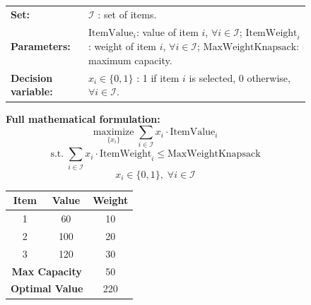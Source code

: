 \documentclass[review,12pt]{elsarticle}
\begin{document}
\begin{figure}[htbp]
{{\begin{tcolorbox}
\begin{tcolorbox}[
    width=\linewidth,
    colframe=form, 
    colback=form!6, 
    title={\textbf{Formulation}}, 
    fonttitle=\bfseries,
    halign title=center,
    boxrule=0.6pt,
    arc=2pt,
    left=1mm, right=1mm, top=0.5mm, bottom=0.5mm,
    before skip=0mm, after skip=0.5mm
]
\vspace{-6mm}
\begin{tabularx}{\linewidth}{@{}lX@{}}
\textbf{Set:} & $\mathcal{I}$ : set of items.\\
\textbf{Parameters:} &
$\text{ItemValue}_i$: value of item $i$, $\forall i \in \mathcal{I}$; 
$\text{ItemWeight}_i$: weight of item $i$, $\forall i \in \mathcal{I}$; 
$\text{MaxWeightKnapsack}$: maximum capacity.\\
\textbf{Decision variable:} & 
$x_i \in \{0,1\}$ : 1 if item $i$ is selected, 0 otherwise, $\forall i \in \mathcal{I}$.\\
\end{tabularx}

\noindent\textbf{Full mathematical formulation:}
\vspace{-3mm}
\begin{equation}
\underset{\{x_i\}}{\text{maximize}} \;
\sum_{i \in \mathcal{I}} x_i \cdot \text{ItemValue}_i
\end{equation}
\vspace{-5mm}
\begin{equation}
\text{s.t.} \;
\sum_{i \in \mathcal{I}} x_i \cdot \text{ItemWeight}_i \leq \text{MaxWeightKnapsack}
\end{equation}
\vspace{-5mm}
\begin{equation}
x_i \in \{0, 1\}, \; \forall i \in \mathcal{I}
\end{equation}
\end{tcolorbox}

\begin{tcolorbox}[
    width=\linewidth,
    colframe=data, 
    colback=data!10, 
    title={\textbf{Sample Data}}, 
    fonttitle=\bfseries,
    halign title=center,
    boxrule=0.6pt,
    arc=2pt,
    left=1mm, right=1mm, top=0.5mm, bottom=0.5mm,
    before skip=0mm, after skip=0mm
]
\centering
\scriptsize
\begin{tabular}{|c|c|c|}
\hline
\textbf{Item} & \textbf{Value} & \textbf{Weight} \\ \hline
1 & 60  & 10 \\ \hline
2 & 100 & 20 \\ \hline
3 & 120 & 30 \\ \hline
\multicolumn{2}{|c|}{\textbf{Max Capacity}} & 50 \\ \hline
\multicolumn{2}{|c|}{\textbf{Optimal Value}} & 220 \\ \hline
\end{tabular}
\end{tcolorbox}


\end{tcolorbox}}}
\end{figure}
\end{document}
